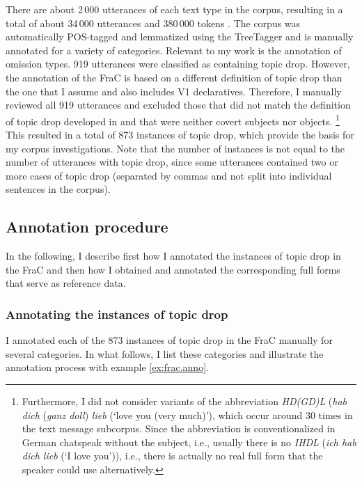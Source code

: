 There are about 2\,000 utterances of each text type  in the corpus, resulting in a total of about 34\,000 utterances and 380\,000 tokens \citep{horch.reich2017}.
The corpus was automatically POS-tagged and lemmatized using the TreeTagger \citep{schmid1994, schmid1995} and is manually annotated for a variety of categories.
Relevant to my work is the annotation of omission types.
919 utterances were classified as containing topic drop.
However, the annotation of the FraC is based on a different definition of topic drop than the one that I assume and also includes V1 declaratives. 
Therefore, I manually reviewed all 919 utterances and excluded those that did not match the definition of topic drop developed in  and that were neither covert subjects nor objects.%
\footnote{Furthermore, I did not consider variants of the abbreviation \textit{HD(GD)L} (\textit{hab dich} (\textit{ganz doll}) \textit{lieb} (`love you (very much)'), which occur around  30 times in the text message subcorpus.
Since the abbreviation is conventionalized in German chatspeak without the subject, i.e., usually there is no \textit{IHDL} (\textit{ich hab dich lieb} (`I love you')), i.e., there is actually no real full form that the speaker could use alternatively.
}
%
This resulted in a total of 873 instances of topic drop, which provide the basis for my corpus investigations.
Note that the number of instances is not equal to the number of utterances with topic drop, since some utterances contained two or more cases of topic drop (separated by commas and not split into individual sentences in the corpus).

\subsection{Annotation procedure}\label{sec:corpus.annotation}
In the following, I describe first how I annotated the instances of topic drop in the FraC and then how I obtained and annotated the corresponding full forms that serve as reference data.

\subsubsection{Annotating the instances of topic drop}
I annotated each of the 873 instances of topic drop in the FraC manually for several categories.
In what follows, I list these categories and illustrate the annotation process with example \ref{ex:frac.anno}.

